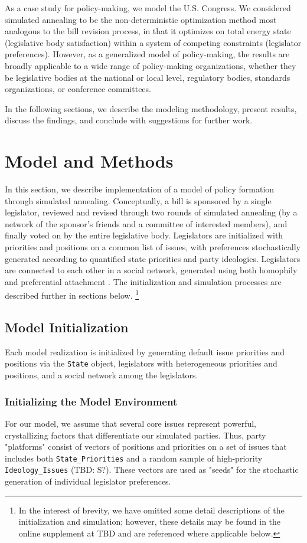 \documentclass[pdftex,12pt]{llncs}
\begin{document}
As a case study for policy-making, we model the U.S. Congress.
We considered simulated annealing to be the non-deterministic optimization method most analogous to the bill revision process, in that it optimizes on total energy state (legislative body satisfaction) within a system of competing constraints (legislator preferences).
However, as a generalized model of policy-making, the results are broadly applicable to a wide range of policy-making organizations, whether they be legislative bodies at the national or local level, regulatory bodies, standards organizations, or conference committees.

In the following sections, we describe the modeling methodology, present results, discuss the findings, and conclude with suggestions for further work.
\section{Model and Methods}
In this section, we describe implementation of a model of policy formation through simulated annealing.
Conceptually, a bill is sponsored by a single legislator, reviewed and revised through two rounds of simulated annealing (by a network of the sponsor's friends and a committee of interested members), and finally voted on by the entire legislative body.
Legislators are initialized with priorities and positions on a common list of issues, with preferences stochastically generated according to quantified state priorities and party ideologies.
Legislators are connected to each other in a social network, generated using both homophily \parencite{msc01, br11} and preferential attachment \parencite{Barabasi1999}.
The initialization and simulation processes are described further in sections below.
\footnote{In the interest of brevity, we have omitted some detail descriptions of the initialization and simulation; however, these details may be found in the online supplement at TBD and are referenced where applicable below.}
\subsection{Model Initialization}
Each model realization is initialized by generating default issue priorities and positions via the \texttt{State} object, legislators with heterogeneous priorities and positions, and a social network among the legislators.
\subsubsection{Initializing the Model Environment}
For our model, we assume that several core issues represent powerful, crystallizing factors that differentiate our simulated parties.
Thus, party "platforms" consist of vectors of positions and priorities on a set of issues that includes both \texttt{State\_Priorities} and a random sample of high-priority \texttt{Ideology\_Issues} (TBD: S?).
These vectors are used as "seeds" for the stochastic generation of individual legislator preferences.
\end{document}

